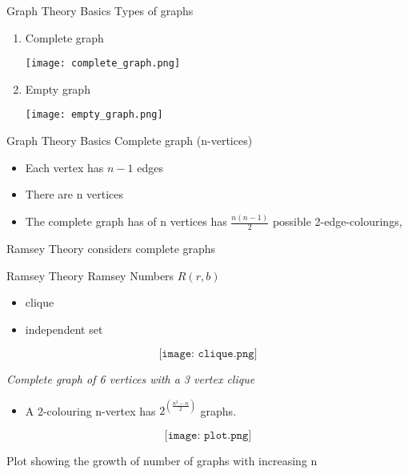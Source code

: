 \documentclass{beamer}
\begin{document}
\begin{frame}{Graph Theory Basics}
Types of graphs
\begin{enumerate}
	\item Complete graph
		\begin{center}
		\texttt{[image: complete\_graph.png]}
	\end{center}\pause
	\item Empty graph
		\begin{center}
		\texttt{[image: empty\_graph.png]}
	\end{center}
\end{enumerate}

\end{frame}
\begin{frame}{Graph Theory Basics}
 Complete graph (n-vertices)
\begin{itemize}
	\item Each vertex has $n-1$ edges
	\item There are n vertices
	\item The complete graph has of n vertices has ${\frac{n(n-1)}{2}}$	possible 2-edge-colourings,

\end{itemize}
Ramsey Theory considers complete graphs
\end{frame}
\begin{frame}{Ramsey Theory}
Ramsey Numbers \( R(r,b) \) 
\begin{itemize}
	\item clique
	\item independent set 
\end{itemize}

$$\texttt{[image: clique.png]}$$
\begin{center}\textit{Complete graph of 6 vertices with a 3 vertex clique}\end{center}
\end{frame}
\begin{frame}
	\begin{itemize}
\item A 2-colouring n-vertex has $2^{\left(\frac{n^2-n}{2}\right)}$ graphs.
\end{itemize}
$$\texttt{[image: plot.png]}$$
\begin{center}
\small{Plot showing the growth of number of graphs with increasing n}
\end{center}
\end{frame}
\end{document}
